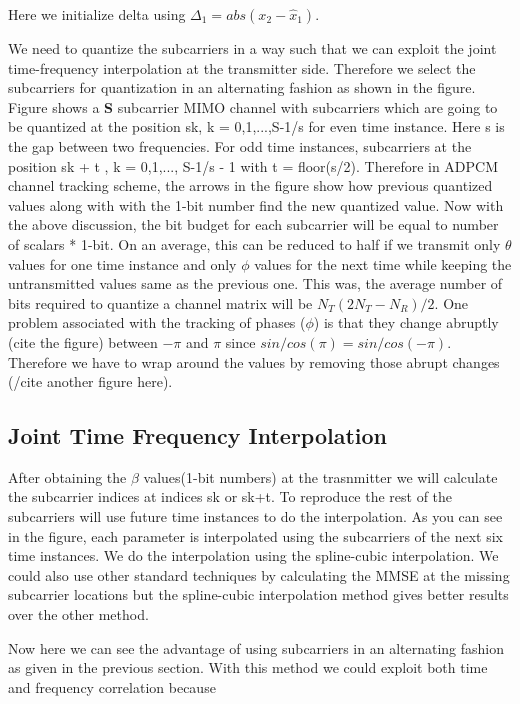 \documentclass[conference]{IEEEtran}
\begin{document}
Here we initialize delta using $\Delta_1 = abs(x_{2}-\hat{x}_1)$.

We need to quantize the subcarriers in a way such that we can exploit the joint time-frequency interpolation at the transmitter side. Therefore we select the subcarriers for quantization in an alternating fashion as shown in the figure. Figure shows a \textbf{S} subcarrier MIMO channel with subcarriers which are going to be quantized at the position sk, k = 0,1,...,S-1/s for even time instance. Here s is the gap between two frequencies. For odd time instances, subcarriers at the position sk + t , k = 0,1,..., S-1/s - 1 with t = floor(s/2).
Therefore in ADPCM channel tracking scheme, the arrows in the figure show how previous quantized values along with with the 1-bit number find the new quantized value. Now with the above discussion, the bit budget for each subcarrier will be equal to number of scalars * 1-bit. On an average, this can be reduced to half if we transmit only $\theta$ values for one time instance and only $\phi$ values for the next time while keeping the untransmitted values same as the previous one. This was, the average number of bits required to quantize a channel matrix will be $N_{T}(2N_{T} - N_{R})/2$.
One problem associated with the tracking of phases ($\phi$) is that they change abruptly (cite the figure) between $-\pi$ and $\pi$ since $sin/cos(\pi) = sin/cos(-\pi)$. Therefore we have to wrap around the values by removing those abrupt changes (/cite another figure here).

\subsection{Joint Time Frequency Interpolation}
\label{interp}

After obtaining the $\beta$ values(1-bit numbers) at the trasnmitter we will calculate the subcarrier indices at indices sk or sk+t. To reproduce the rest of the subcarriers will use future time instances to do the interpolation. As you can see in the figure, each parameter is interpolated using the subcarriers of the next six time instances. We do the interpolation using the spline-cubic interpolation. We could also use other standard techniques by calculating the MMSE at the missing subcarrier locations but the spline-cubic interpolation method gives better results over the other method.

Now here we can see the advantage of using subcarriers in an alternating fashion as given in the previous section. With this method we could exploit both time and frequency correlation because
\end{document}
